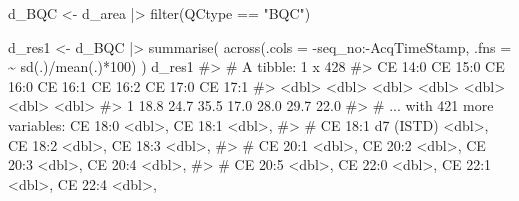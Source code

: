 \documentclass[
  letterpaper,
  DIV=11,
  numbers=noendperiod]{scrreprt}
\newenvironment{Shaded}{\begin{snugshade}}{\end{snugshade}}
\newcommand{\AttributeTok}[1]{\textcolor[rgb]{0.40,0.45,0.13}{#1}}
\newcommand{\CommentTok}[1]{\textcolor[rgb]{0.37,0.37,0.37}{#1}}
\newcommand{\DecValTok}[1]{\textcolor[rgb]{0.68,0.00,0.00}{#1}}
\newcommand{\FunctionTok}[1]{\textcolor[rgb]{0.28,0.35,0.67}{#1}}
\newcommand{\NormalTok}[1]{\textcolor[rgb]{0.00,0.23,0.31}{#1}}
\newcommand{\OtherTok}[1]{\textcolor[rgb]{0.00,0.23,0.31}{#1}}
\newcommand{\SpecialCharTok}[1]{\textcolor[rgb]{0.37,0.37,0.37}{#1}}
\newcommand{\StringTok}[1]{\textcolor[rgb]{0.13,0.47,0.30}{#1}}
\begin{document}
\begin{Shaded}
\begin{Highlighting}[]
\NormalTok{d\_BQC }\OtherTok{\textless{}{-}}\NormalTok{ d\_area }\SpecialCharTok{|\textgreater{}} \FunctionTok{filter}\NormalTok{(QCtype }\SpecialCharTok{==} \StringTok{"BQC"}\NormalTok{)}


\NormalTok{d\_res1 }\OtherTok{\textless{}{-}}\NormalTok{ d\_BQC }\SpecialCharTok{|\textgreater{}}
  \FunctionTok{summarise}\NormalTok{(}
    \FunctionTok{across}\NormalTok{(}\AttributeTok{.cols =} \SpecialCharTok{{-}}\NormalTok{seq\_no}\SpecialCharTok{:{-}}\NormalTok{AcqTimeStamp,}
           \AttributeTok{.fns =} \SpecialCharTok{\textasciitilde{}} \FunctionTok{sd}\NormalTok{(.)}\SpecialCharTok{/}\FunctionTok{mean}\NormalTok{(.)}\SpecialCharTok{*}\DecValTok{100}\NormalTok{)}
\NormalTok{  )}
\NormalTok{d\_res1}
\CommentTok{\#\textgreater{} \# A tibble: 1 x 428}
\CommentTok{\#\textgreater{}   \textasciigrave{}CE 14:0\textasciigrave{} \textasciigrave{}CE 15:0\textasciigrave{} \textasciigrave{}CE 16:0\textasciigrave{} \textasciigrave{}CE 16:1\textasciigrave{} \textasciigrave{}CE 16:2\textasciigrave{} \textasciigrave{}CE 17:0\textasciigrave{} \textasciigrave{}CE 17:1\textasciigrave{}}
\CommentTok{\#\textgreater{}       \textless{}dbl\textgreater{}     \textless{}dbl\textgreater{}     \textless{}dbl\textgreater{}     \textless{}dbl\textgreater{}     \textless{}dbl\textgreater{}     \textless{}dbl\textgreater{}     \textless{}dbl\textgreater{}}
\CommentTok{\#\textgreater{} 1      18.8      24.7      35.5      17.0      28.0      29.7      22.0}
\CommentTok{\#\textgreater{} \# ... with 421 more variables: \textasciigrave{}CE 18:0\textasciigrave{} \textless{}dbl\textgreater{}, \textasciigrave{}CE 18:1\textasciigrave{} \textless{}dbl\textgreater{},}
\CommentTok{\#\textgreater{} \#   \textasciigrave{}CE 18:1 d7 (ISTD)\textasciigrave{} \textless{}dbl\textgreater{}, \textasciigrave{}CE 18:2\textasciigrave{} \textless{}dbl\textgreater{}, \textasciigrave{}CE 18:3\textasciigrave{} \textless{}dbl\textgreater{},}
\CommentTok{\#\textgreater{} \#   \textasciigrave{}CE 20:1\textasciigrave{} \textless{}dbl\textgreater{}, \textasciigrave{}CE 20:2\textasciigrave{} \textless{}dbl\textgreater{}, \textasciigrave{}CE 20:3\textasciigrave{} \textless{}dbl\textgreater{}, \textasciigrave{}CE 20:4\textasciigrave{} \textless{}dbl\textgreater{},}
\CommentTok{\#\textgreater{} \#   \textasciigrave{}CE 20:5\textasciigrave{} \textless{}dbl\textgreater{}, \textasciigrave{}CE 22:0\textasciigrave{} \textless{}dbl\textgreater{}, \textasciigrave{}CE 22:1\textasciigrave{} \textless{}dbl\textgreater{}, \textasciigrave{}CE 22:4\textasciigrave{} \textless{}dbl\textgreater{},}

\end{Highlighting}
\end{Shaded}
\end{document}
